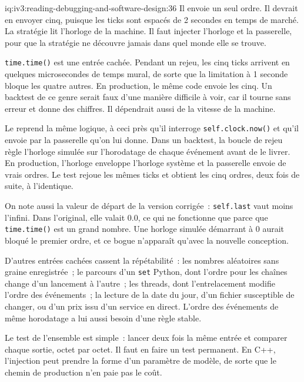 \begin{solution}{iq:iv3:reading-debugging-and-software-design:36}
Il envoie un seul ordre. Il devrait en envoyer cinq, puisque les ticks sont espacés de 2 secondes en temps de marché. La stratégie lit l'horloge de la machine. Il faut injecter l'horloge et la passerelle, pour que la stratégie ne découvre jamais dans quel monde elle se trouve.

\texttt{time.time()} est une entrée cachée. Pendant un rejeu, les cinq ticks arrivent en quelques microsecondes de temps mural, de sorte que la limitation à 1 seconde bloque les quatre autres. En production, le même code envoie les cinq. Un backtest de ce genre serait faux d'une manière difficile à voir, car il tourne sans erreur et donne des chiffres. Il dépendrait aussi de la vitesse de la machine.

Le  reprend la même logique, à ceci près qu'il interroge \texttt{self.clock.now()} et qu'il envoie par la passerelle qu'on lui donne. Dans un backtest, la boucle de rejeu règle l'horloge simulée sur l'horodatage de chaque événement avant de le livrer. En production, l'horloge enveloppe l'horloge système et la passerelle envoie de vrais ordres. Le test rejoue les mêmes ticks et obtient les cinq ordres, deux fois de suite, à l'identique.

\label{lst:iv3:rd:strategyfixed}

On note aussi la valeur de départ de la version corrigée~: \texttt{self.last} vaut moins l'infini. Dans l'original, elle valait 0.0, ce qui ne fonctionne que parce que \texttt{time.time()} est un grand nombre. Une horloge simulée démarrant à 0 aurait bloqué le premier ordre, et ce bogue n'apparaît qu'avec la nouvelle conception.

D'autres entrées cachées cassent la répétabilité~: les nombres aléatoires sans graine enregistrée~; le parcours d'un \texttt{set} Python, dont l'ordre pour les chaînes change d'un lancement à l'autre~; les threads, dont l'entrelacement modifie l'ordre des événements~; la lecture de la date du jour, d'un fichier susceptible de changer, ou d'un prix issu d'un service en direct. L'ordre des événements de même horodatage a lui aussi besoin d'une règle stable.

Le test de l'ensemble est simple~: lancer deux fois la même entrée et comparer chaque sortie, octet par octet. Il faut en faire un test permanent. En C++, l'injection peut prendre la forme d'un paramètre de modèle, de sorte que le chemin de production n'en paie pas le coût.


\end{solution}

